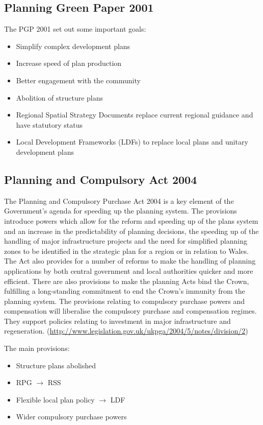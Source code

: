 \documentclass{article}
\begin{document}
	\subsection*{Planning Green Paper 2001}	
	The PGP 2001 set out some important goals:
	\begin{itemize}
		\item Simplify complex development plans
		\item Increase speed of plan production
		\item Better engagement with the community
		\item Abolition of structure plans
		\item Regional Spatial Strategy Documents replace current regional guidance and have statutory status
		\item Local Development Frameworks (LDFs) to replace local plans and unitary development plans
	\end{itemize}		
	
	\subsection*{Planning and Compulsory Act 2004}	
	The Planning and Compulsory Purchase Act 2004 is a key element of the Government’s agenda for speeding up the planning system. The provisions introduce powers which allow for the reform and speeding up of the plans system and an increase in the predictability of planning decisions, the speeding up of the handling of major infrastructure projects and the need for simplified planning zones to be identified in the strategic plan for a region or in relation to Wales. The Act also provides for a number of reforms to make the handling of planning applications by both central government and local authorities quicker and more efficient. There are also provisions to make the planning Acts bind the Crown, fulfilling a long-standing commitment to end the Crown's immunity from the planning system. The provisions relating to compulsory purchase powers and compensation will liberalise the compulsory purchase and compensation regimes. They support policies relating to investment in major infrastructure and regeneration. (\url{http://www.legislation.gov.uk/ukpga/2004/5/notes/division/2})
	
	The main provisions:
	\begin{itemize}
		\item Structure plans abolished
		\item RPG $\rightarrow$ RSS
		\item Flexible local plan policy $\rightarrow$ LDF
		\item Wider compulsory purchase powers
	\end{itemize}
	
\end{document}
